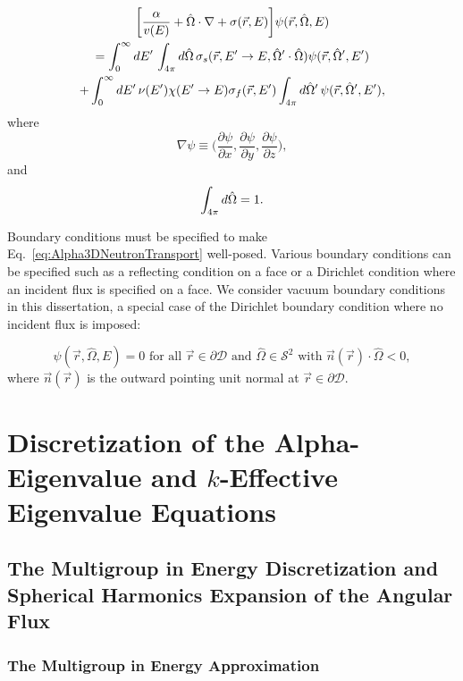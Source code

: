 \begin{multline}
	\bigg [ \frac{\alpha}{v(E)} + \hat{\Omega} \cdot \nabla + \sigma(\vec{r},E) \bigg ] \psi(\vec{r},\hat{\Omega},E) \\ = \int_{0}^{\infty} \mathop{}\!d E' \, \int_{4\pi} \mathop{}\!d \hat{\Omega} \, \sigma_{s}(\vec{r},E'\rightarrow E,\hat{\Omega}' \cdot \hat{\Omega}) \psi(\vec{r},\hat{\Omega}',E') \\ + \int_{0}^{\infty} \mathop{}\!d E' \, \nu(E') \chi(E'\rightarrow E) \sigma_{f}(\vec{r},E') \int_{4\pi} \mathop{}\!d \hat{\Omega}' \, \psi(\vec{r},\hat{\Omega}',E'), 
	\label{eq:Alpha3DNeutronTransport}
\end{multline}
where
\begin{equation}
	\nabla \psi \equiv \bigg (\frac{\partial \psi}{\partial x}, \frac{\partial \psi}{\partial y}, \frac{\partial \psi}{\partial z} \bigg ),
\end{equation}
and
\begin{equation}
	 \int_{4\pi} \mathop{}\!d \hat{\Omega} = 1.
\end{equation}

Boundary conditions must be specified to make Eq.~\ref{eq:Alpha3DNeutronTransport} well-posed. Various boundary conditions can be specified such as a reflecting condition on a face or a Dirichlet condition where an incident flux is specified on a face. We consider vacuum boundary conditions in this dissertation, a special case of the Dirichlet boundary condition where no incident flux is imposed:

\begin{equation}
	\psi(\vec{r},\hat{\Omega},E) = 0 \text{ for all } \vec{r} \in \partial \mathcal{D} \text{ and } \hat{\Omega} \in \mathcal{S}^{2} \text{ with } \vec{n}(\vec{r}) \cdot \hat{\Omega} < 0,
\end{equation}
where $\vec{n}(\vec{r})$ is the outward pointing unit normal at $\vec{r} \in \partial \mathcal{D}$.

\section{Discretization of the Alpha-Eigenvalue and $k$-Effective Eigenvalue Equations}

\subsection{The Multigroup in Energy Discretization and Spherical Harmonics Expansion of the Angular Flux}

\subsubsection{The Multigroup in Energy Approximation}

